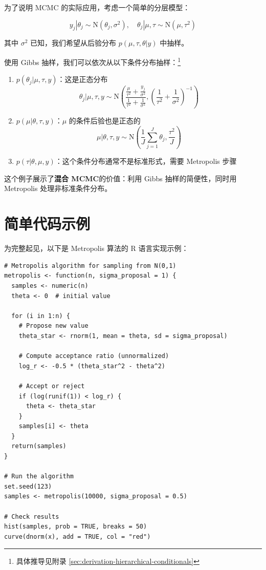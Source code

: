 为了说明 MCMC 的实际应用，考虑一个简单的分层模型：

\begin{equation}\label{eq:hierarchical-model}
y_j | \theta_j \sim \mathrm{N}(\theta_j, \sigma^2), \quad \theta_j | \mu, \tau \sim \mathrm{N}(\mu, \tau^2)
\end{equation}

其中 $\sigma^2$ 已知，我们希望从后验分布 $p(\mu, \tau, \theta | y)$ 中抽样。

使用 Gibbs 抽样，我们可以依次从以下条件分布抽样：\footnote{具体推导见附录 \cref{sec:derivation-hierarchical-conditionals}}

\begin{enumerate}
  \item $p(\theta_j | \mu, \tau, y)$：这是正态分布
    \[
    \theta_j | \mu, \tau, y \sim \mathrm{N}\!\left(\frac{\frac{\mu}{\tau^2} + \frac{y_j}{\sigma^2}}{\frac{1}{\tau^2} + \frac{1}{\sigma^2}}, \left(\frac{1}{\tau^2} + \frac{1}{\sigma^2}\right)^{-1}\right)
    \]
  \item $p(\mu | \theta, \tau, y)$：$\mu$ 的条件后验也是正态的
    \[
    \mu | \theta, \tau, y \sim \mathrm{N}\!\left(\frac{1}{J}\sum_{j=1}^J \theta_j, \frac{\tau^2}{J}\right)
    \]
  \item $p(\tau | \theta, \mu, y)$：这个条件分布通常不是标准形式，需要 Metropolis 步骤
\end{enumerate}

这个例子展示了\textbf{混合 MCMC}的价值：利用 Gibbs 抽样的简便性，同时用 Metropolis 处理非标准条件分布。

\section{简单代码示例}

为完整起见，以下是 Metropolis 算法的 R 语言实现示例：

\begin{verbatim}
# Metropolis algorithm for sampling from N(0,1)
metropolis <- function(n, sigma_proposal = 1) {
  samples <- numeric(n)
  theta <- 0  # initial value

  for (i in 1:n) {
    # Propose new value
    theta_star <- rnorm(1, mean = theta, sd = sigma_proposal)

    # Compute acceptance ratio (unnormalized)
    log_r <- -0.5 * (theta_star^2 - theta^2)

    # Accept or reject
    if (log(runif(1)) < log_r) {
      theta <- theta_star
    }
    samples[i] <- theta
  }
  return(samples)
}

# Run the algorithm
set.seed(123)
samples <- metropolis(10000, sigma_proposal = 0.5)

# Check results
hist(samples, prob = TRUE, breaks = 50)
curve(dnorm(x), add = TRUE, col = "red")
\end{verbatim}

